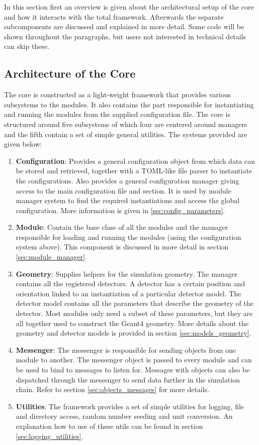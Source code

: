 In this section first an overview is given about the architectural setup of the core and how it interacts with the total \apsq framework. Afterwards the separate subcomponents are discussed and explained in more detail. Some code will be shown throughout the paragraphs, but users not interested in technical details can skip these.

\subsection{Architecture of the Core}
The core is constructed as a light-weight framework that provides various subsystems to the modules. It also contains the part responsible for instantiating and running the modules from the supplied configuration file. The core is structured around five subsystems of which four are centered around managers and the fifth contain a set of simple general utilities. The systems provided are given below:
\begin{enumerate}
\item \textbf{Configuration}: Provides a general configuration object from which data can be stored and retrieved, together with a TOML-like\cite{tomlgit} file parser to instantiate the configurations. Also provides a general \apsq configuration manager giving access to the main configuration file and section. It is used by module manager system to find the required instantiations and access the global configuration. More information is given in \ref{sec:config_parameters}.
\item \textbf{Module}: Contain the base class of all the \apsq modules and the manager responsible for loading and running the modules (using the configuration system above). This component is discussed in more detail in section \ref{sec:module_manager}.
\item \textbf{Geometry}: Supplies helpers for the simulation geometry. The manager contains all the registered detectors. A detector has a certain position and orientation linked to an instantiation of a particular detector model. The detector model contains all the parameters that describe the geometry of the detector. Most modules only need a subset of these parameters, but they are all together used to construct the Geant4 geometry. More details about the geometry and detector models is provided in section \ref{sec:models_geometry}.
\item \textbf{Messenger}: The messenger is responsible for sending objects from one module to another. The messenger object is passed to every module and can be used to bind to messages to listen for. Messages with objects can also be dispatched through the messenger to send data further in the simulation chain. Refer to section \ref{sec:objects_messages} for more details.
\item \textbf{Utilities}: The framework provides a set of simple utilities for logging, file and directory access, random number seeding and unit conversion. An explanation how to use of these utils can be found in section \ref{sec:logging_utilities}. 
\end{enumerate}

